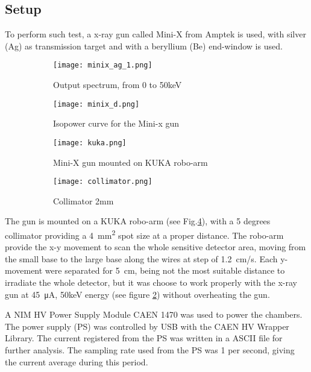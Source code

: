 \subsection{Setup}
To perform such test, a x-ray gun called Mini-X\cite{xgun} from Amptek is used, with silver (Ag) as transmission target and with a
beryllium (Be) end-window is used.\par

\begin{figure}
	\centering
	\hspace*{\fill}
	{\begin{subfigure}[b]{0.4\textwidth}
	\centering
	\texttt{[image: minix\_ag\_1.png]}
	\caption{Output spectrum, from 0 to 50keV}\label{fig:minixgun}
	\end{subfigure}
	}
	\hfill
	{
	\begin{subfigure}[b]{0.4\textwidth}
	\centering
	\texttt{[image: minix\_d.png]}
		\caption{Isopower curve for the Mini-x gun}\label{fig:ispower}
	\end{subfigure}
	}
	\hspace*{\fill}
	\caption{}\label{}
\end{figure}

\begin{figure}
	\centering
	\hspace*{\fill}
	{\begin{subfigure}[b]{0.4\textwidth}
	\centering
	\texttt{[image: kuka.png]}
	\caption{Mini-X gun mounted on KUKA robo-arm}\label{fig:kuka}
	\end{subfigure}
	}
	\hfill
	{
	\begin{subfigure}[b]{0.4\textwidth}
	\centering
	\texttt{[image: collimator.png]}
		\caption{Collimator 2mm}\label{fig:collimator}
	\end{subfigure}
	}
	\hspace*{\fill}
	\caption{}\label{}
\end{figure}

The gun is mounted on a KUKA robo-arm (see Fig.\ref{fig:kuka}), with a 5 degrees collimator providing a \SI{4}{mm^2} spot size at a proper
distance. The robo-arm provide the x-y movement to scan the whole sensitive detector area, moving from the small base to
the large base along the wires at step of \SI{1.2}{cm/s}. Each y-movement were separated for \SI{5}{cm}, being not the
most suitable distance to irradiate the whole detector, but it was choose to work properly with the x-ray gun at
\SI{45}{\micro A}, 50keV energy (see figure \ref{fig:ispower}) without overheating the gun.\par
A NIM HV Power Supply Module CAEN 1470 was used to power the chambers. The power supply (PS) was controlled by USB with the
CAEN HV Wrapper Library. The current registered from the PS was written in a ASCII file for further analysis. The
sampling rate used from the PS was 1 per second, giving the current average during this period.\par

